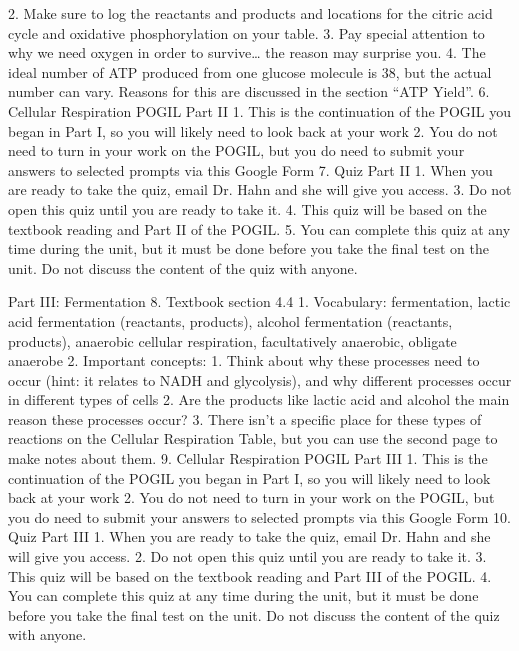       2. Make sure to log the reactants and products and locations for the citric acid cycle and oxidative phosphorylation on your table.
      3. Pay special attention to why we need oxygen in order to survive… the reason may surprise you.
      4. The ideal number of ATP produced from one glucose molecule is 38, but the actual number can vary. Reasons for this are discussed in the section “ATP Yield”.
6. Cellular Respiration POGIL Part II 
   1. This is the continuation of the POGIL you began in Part I, so you will likely need to look back at your work 
   2. You do not need to turn in your work on the POGIL, but you do need to submit your answers to selected prompts via this Google Form
7. Quiz Part II 
   1. When you are ready to take the quiz, email Dr. Hahn and she will give you access.
   3. Do not open this quiz until you are ready to take it.
   4. This quiz will be based on the textbook reading and Part II of the POGIL. 
   5. You can complete this quiz at any time during the unit, but it must be done before you take the final test on the unit. Do not discuss the content of the quiz with anyone.


Part III: Fermentation
8. Textbook section 4.4
   1. Vocabulary: fermentation, lactic acid fermentation (reactants, products), alcohol fermentation (reactants, products), anaerobic cellular respiration, facultatively anaerobic, obligate anaerobe 
   2. Important concepts:
      1. Think about why these processes need to occur (hint: it relates to NADH and glycolysis), and why different processes occur in different types of cells
      2. Are the products like lactic acid and alcohol the main reason these processes occur?
      3. There isn’t a specific place for these types of reactions on the Cellular Respiration Table, but you can use the second page to make notes about them.
9. Cellular Respiration POGIL Part III 
   1. This is the continuation of the POGIL you began in Part I, so you will likely need to look back at your work 
   2. You do not need to turn in your work on the POGIL, but you do need to submit your answers to selected prompts via this Google Form
10. Quiz Part III 
   1. When you are ready to take the quiz, email Dr. Hahn and she will give you access.
   2. Do not open this quiz until you are ready to take it.
   3. This quiz will be based on the textbook reading and Part III of the POGIL. 
   4. You can complete this quiz at any time during the unit, but it must be done before you take the final test on the unit. Do not discuss the content of the quiz with anyone.


